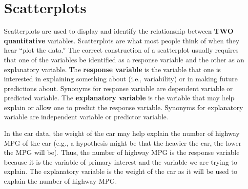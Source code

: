\documentclass[10pt,openany]{book}\usepackage[]{graphicx}\usepackage[]{color}
\begin{document}
\section{Scatterplots} 
Scatterplots are used to display and identify the relationship between \textbf{TWO quantitative} variables.  Scatterplots are what most people think of when they hear ``plot the data.''  The correct construction of a scatterplot usually requires that one of the variables be identified as a response variable and the other as an explanatory variable.  The \textbf{response variable} is the variable that one is interested in explaining something about (i.e., variability) or in making future predictions about.  Synonyms for response variable are dependent variable or predicted variable.  The \textbf{explanatory variable} is the variable that may help explain or allow one to predict the response variable.  Synonyms for explanatory variable are independent variable or predictor variable.


\vspace{-12pt}

\vspace{-12pt}

In the car data, the weight of the car may help explain the number of highway MPG of the car (e.g., a hypothesis might be that the heavier the car, the lower the MPG will be).  Thus, the number of highway MPG is the response variable because it is the variable of primary interest and the variable we are trying to explain.  The explanatory variable is the weight of the car as it will be used to explain the number of highway MPG.
\end{document}
